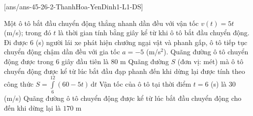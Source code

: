 [ans/ans-45-26-2-ThanhHoa-YenDinh1-L1-DS]
\cauds
\begin{ex}%
	Một ô tô bắt đầu chuyển động thẳng nhanh dần đều với vận tốc $v(t) = 5t$ (m/s); trong đó $t$ là thời gian tính bằng giây kể từ khi ô tô bắt đầu chuyển động. Đi được $6$ (s) người lái xe phát hiện chướng ngại vật và phanh gấp, ô tô tiếp tục chuyển động chậm dần đều với gia tốc $a = -5$ (m/s$^2$).
	\choiceTF
	{Quãng đường ô tô chuyển động được trong $6$ giây đầu tiên là $80$ m}
	{\True Quãng đường $S$ (đơn vị: mét) mà ô tô chuyển động được kể từ lúc bắt đầu đạp phanh đến khi dừng lại được tính theo công thức $S = \displaystyle\int\limits_6^{12} (60 - 5t) \mathrm{\,d}t$}
	{\True Vận tốc của ô tô tại thời điểm $t = 6$ (s) là $30$ (m/s)}
	{Quãng đường ô tô chuyển động được kể từ lúc bắt đầu chuyển động cho đến khi dừng lại là $170$ m}
\end{ex}

